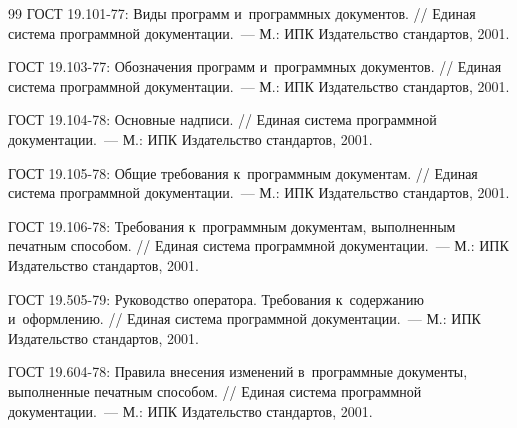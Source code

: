 \documentclass[12pt,a4paper]{extarticle}
\begin{document}
\renewcommand{\refname}{}
\begin{thebibliography}{99}
ГОСТ 19.101-77: Виды программ и~программных документов. // Единая система программной документации.~--- М.: ИПК Издательство стандартов, 2001.

ГОСТ 19.103-77: Обозначения программ и~программных документов. // Единая система программной документации.~--- М.: ИПК Издательство стандартов, 2001.

ГОСТ 19.104-78: Основные надписи. // Единая система программной документации.~--- М.: ИПК Издательство стандартов, 2001.

ГОСТ 19.105-78: Общие требования к~программным документам. // Единая система программной документации.~--- М.: ИПК Издательство стандартов, 2001.

ГОСТ 19.106-78: Требования к~программным документам, выполненным печатным способом. // Единая система программной документации.~--- М.: ИПК Издательство стандартов, 2001.

ГОСТ 19.505-79: Руководство оператора. Требования к~содержанию и~оформлению. // Единая система программной документации.~--- М.: ИПК Издательство стандартов, 2001.

ГОСТ 19.604-78: Правила внесения изменений в~программные документы, выполненные печатным способом. // Единая система программной документации.~--- М.: ИПК Издательство стандартов, 2001.
\end{thebibliography}


\clearpage


\end{document}
